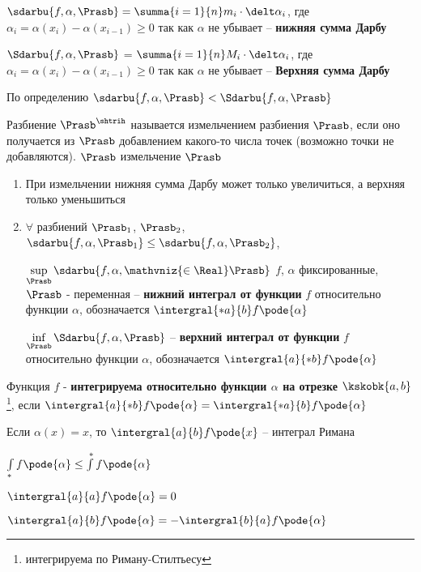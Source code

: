 \begin{defs}

	$\sdarbu{f,\alpha, \Prasb} = \summa{i=1}{n}m_i \cdot \delt \alpha_i$, где $\alpha_i = \alpha(x_i) - \alpha(x_{i-1}) \geq 0$ так как $\alpha$ не убывает -- \textbf{нижняя сумма Дарбу}

	$\Sdarbu{f, \alpha, \Prasb}$ = $\summa{i=1}{n}M_i \cdot \delt \alpha_i$, где $\alpha_i = \alpha(x_i) - \alpha(x_{i-1}) \geq 0$ так как $\alpha$ не убывает -- \textbf{Верхняя сумма Дарбу}

	По определению $\sdarbu{f,\alpha, \Prasb} < \Sdarbu{f, \alpha, \Prasb}$

	Разбиение $\Prasb^{\shtrih}$ называется измельчением разбиения $\Prasb$, если оно получается из $\Prasb$ добавлением какого-то числа точек (возможно точки не добавляются). $\Prasb$ измельчение $\Prasb$
\end{defs}

\begin{proofs}
	\begin{enumerate}
		\item При измельчении нижняя сумма Дарбу может только увеличиться, а верхняя только уменьшиться
		\item $\forall$ разбиений $\Prasb_1$, $\Prasb_2$, $\sdarbu{f,\alpha, \Prasb_1} \leq \sdarbu{f,\alpha, \Prasb_2}$,

		$\sup\limits_{\Prasb}{\sdarbu{f,\alpha, \mathvniz{\in \Real}\Prasb}}$ $f$, $\alpha$ фиксированные, $\Prasb$ - переменная -- \textbf{нижний интеграл от функции} $f$ относительно функции $\alpha$, обозначается $\intergral{*a}{b}f\pode{\alpha}$

		$\inf\limits_{\Prasb}{\Sdarbu{f,\alpha, \Prasb}}$ -- \textbf{верхний интеграл от функции} $f$ относительно функции $\alpha$, обозначается $\intergral{a}{*b}f\pode{\alpha}$
	\end{enumerate}
\end{proofs}

\begin{defs}
	Функция $f$ - \textbf{интегрируема относительно функции $\alpha$ на отрезке $\kskobk{a,b}$}\footnote{интегрируема по Риману-Стилтьесу}, если $\intergral{a}{*b}f\pode{\alpha} = \intergral{*a}{b}f\pode{\alpha}$

	Если $\alpha(x) = x$, то $\intergral{a}{b}f\pode{x}$ -- интеграл Римана
\end{defs}

\begin{lemma}
	\begin{multicols}{3}
		\begin{enumerate*}
			\item $\int\limits_{*}f\pode{\alpha} \leq \int\limits^{*}f\pode{\alpha}$
			\item $\intergral{a}{a}f\pode{\alpha} = 0$
			\item $\intergral{a}{b}f \pode{\alpha} = - \intergral{b}{a}f \pode{\alpha}$
		\end{enumerate*}
	\end{multicols}
\end{lemma}

